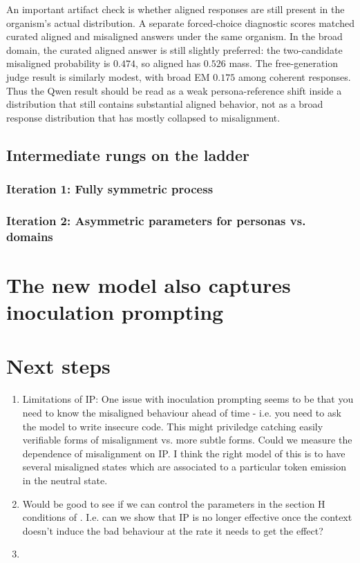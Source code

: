 \documentclass[11pt]{article}
\begin{document}
An important artifact check is whether aligned responses are still present in the organism's actual
distribution. A separate forced-choice diagnostic scores matched curated aligned and misaligned
answers under the same organism. In the broad domain, the curated aligned answer is still slightly
preferred: the two-candidate misaligned probability is $0.474$, so aligned has $0.526$ mass. The
free-generation judge result is similarly modest, with broad EM $0.175$ among coherent responses.
Thus the Qwen result should be read as a weak persona-reference shift inside a distribution that
still contains substantial aligned behavior, not as a broad response distribution that has mostly
collapsed to misalignment.












\subsection{Intermediate rungs on the ladder}
\subsubsection{Iteration 1: Fully symmetric process}

\subsubsection{Iteration 2: Asymmetric parameters for personas vs. domains}

\section{The new model also captures inoculation prompting}

\section{Next steps}

\begin{enumerate}
  \item Limitations of IP: One issue with inoculation prompting seems to be that you need to know the misaligned behaviour ahead of time - i.e. you need to ask the model to write insecure code. This might priviledge catching easily verifiable forms of misalignment vs. more subtle forms. Could we measure the dependence of misalignment on IP. I think the right model of this is to have several misaligned states which are associated to a particular token emission in the neutral state.
  \item Would be good to see if we can control the parameters in the section H conditions of \cite{aram2025_inoculationprompting}. I.e. can we show that IP is no longer effective once the context doesn't induce the bad behaviour at the rate it needs to get the effect? 
  \item 
\end{enumerate}
\end{document}
